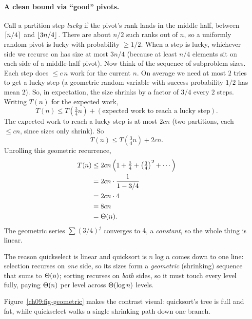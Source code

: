 \paragraph{A clean bound via ``good'' pivots.}
Call a partition step \emph{lucky} if the pivot's rank lands in the middle half,
between $\lceil n/4\rceil$ and $\lfloor3n/4\rfloor$. There are about $n/2$ such ranks out of
$n$, so a uniformly random pivot is lucky with probability $\ge 1/2$. When a step
is lucky, whichever side we recurse on has size at most $3n/4$ (because at least
$n/4$ elements sit on each side of a middle-half pivot). Now think of the sequence
of subproblem sizes. Each step does $\le c\,n$ work for the current $n$. On average
we need at most $2$ tries to get a lucky step (a geometric random variable with
success probability $1/2$ has mean $2$). So, in expectation, the size shrinks by a
factor of $3/4$ every $2$ steps. Writing $T(n)$ for the expected work,
\[
T(n) \le T\!\left(\tfrac{3}{4}n\right) + (\text{expected work to reach a lucky step}).
\]
The expected work to reach a lucky step is at most $2 c n$ (two partitions, each
$\le cn$, since sizes only shrink). So
\[
T(n) \le T\!\left(\tfrac{3}{4}n\right) + 2 c n.
\]
Unrolling this geometric recurrence,
\begin{align*}
  T(n) &\le 2cn\left(1 + \tfrac{3}{4} + \left(\tfrac{3}{4}\right)^2 + \cdots\right) \\
       &= 2cn \cdot \frac{1}{1 - 3/4} \\
       &= 2cn \cdot 4 \\
       &= 8cn \\
       &= \Theta(n).
\end{align*}
The geometric series $\sum (3/4)^j$ converges to $4$, a \emph{constant}, so the
whole thing is linear.

\begin{focusbox}
The reason quickselect is linear and quicksort is $n\log n$ comes down to one line:
selection recurses on \emph{one} side, so its sizes form a \emph{geometric}
(shrinking) sequence that sums to $\Theta(n)$; sorting recurses on \emph{both} sides,
so it must touch every level fully, paying $\Theta(n)$ per level across $\Theta(\log n)$
levels.
\end{focusbox}

Figure~\ref{ch09:fig-geometric} makes the contrast visual: quicksort's tree is full
and fat, while quickselect walks a single shrinking path down one branch.

